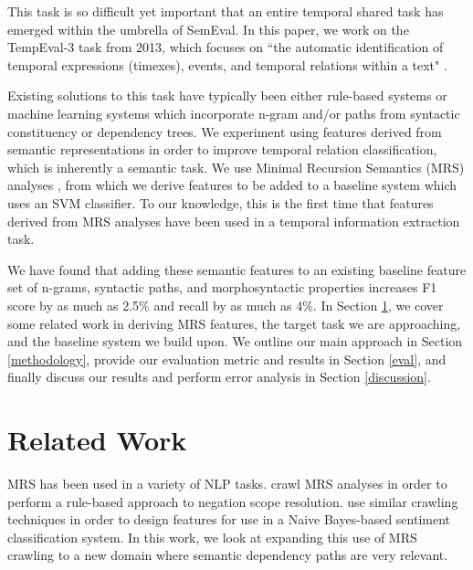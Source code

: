 \documentclass[11pt]{article}
\begin{document}
This task is so difficult yet important that an entire temporal shared task has emerged within the umbrella of SemEval. In this paper, we work on the TempEval-3 task from 2013, which focuses on ``the automatic identification of temporal expressions (timexes), events, and temporal relations within a text" \cite{UzZaman:13}.

Existing solutions to this task have typically been either rule-based systems or machine learning systems which incorporate n-gram and/or paths from syntactic constituency or dependency trees. We experiment using features derived from semantic representations in order to improve temporal relation classification, which is inherently a semantic task. We use Minimal Recursion Semantics (MRS) analyses \cite{Copestake:05}, from which we derive features to be added to a baseline system which uses an SVM classifier. To our knowledge, this is the first time that features derived from MRS analyses have been used in a temporal information extraction task.

We have found that adding these semantic features to an existing baseline feature set of n-grams, syntactic paths, and morphosyntactic properties increases F1 score by as much as 2.5\% and recall by as much as 4\%. In Section \ref{related-work}, we cover some related work in deriving MRS features, the target task we are approaching, and the baseline system we build upon. We outline our main approach in Section \ref{methodology}, provide our evaluation metric and results in Section \ref{eval}, and finally discuss our results and perform error analysis in Section \ref{discussion}.


\section{Related Work}
\label{related-work}


MRS has been used in a variety of NLP tasks.  crawl MRS analyses in order to perform a rule-based approach to negation scope resolution.  use similar crawling techniques in order to design features for use in a Naive Bayes-based sentiment classification system. In this work, we look at expanding this use of MRS crawling to a new domain where semantic dependency paths are very relevant.
\end{document}
